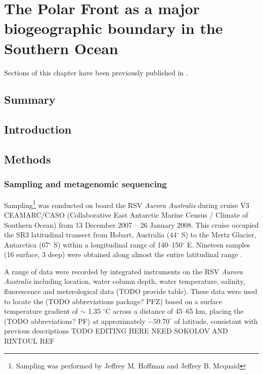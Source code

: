 \chapter{The Polar Front as a major biogeographic boundary in the Southern Ocean} 
\label{ch:polarfront}

Sections of this chapter have been previously published in .

\section{Summary}

\section{Introduction}


\section{Methods}
\subsection{Sampling and metagenomic sequencing}

Sampling\footnote{Sampling was performed by Jeffrey M. Hoffman and Jeffrey B. Mcquaid} was conducted on board the RSV \emph{Aurora Australis} during cruise V3 CEAMARC/CASO (Collaborative East Antarctic Marine Census / Climate of Southern Ocean) from 13 December 2007 -- 26 January 2008. 
This cruise occupied the SR3 latitudinal transect from Hobart, Australia (44$^\circ$ S) to the Mertz Glacier, Antarctica (67$^\circ$ S) within a longitudinal range of 140--150$^\circ$ E.
Nineteen samples (16 surface, 3 deep) were obtained along almost the entire latitudinal range .



A range of data were recorded by integrated instruments on the RSV \emph{Aurora Australis} including location, water column depth, water temperature, salinity, fluorescence and meterological data (TODO provide table).
These data were used to locate the (TODO abbreviations package? PFZ) based on a surface temperature gradient of $\sim$ 1.35 $^\circ$C across a distance of 45--65 km, placing the (TODO abbreviations? PF) at approximately $-59.70^\circ$ of latitude, consistant with previous descriptions TODO EDITING HERE NEED SOKOLOV AND RINTOUL REF

